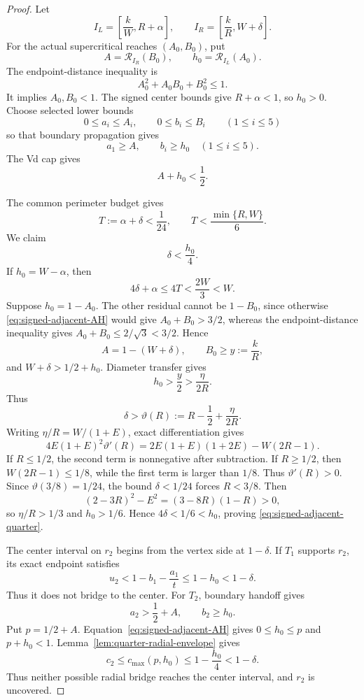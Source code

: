 \begin{proof}
Let
\[
 I_L=\left[\frac{k}{W},R+\alpha\right],
 \qquad
 I_R=\left[\frac{k}{R},W+\delta\right].
\]
For the actual supercritical reaches $(A_0,B_0)$, put
\[
 A=\mathcal R_{I_R}(B_0),
 \qquad
 h_0=\mathcal R_{I_L}(A_0).
\]
The endpoint-distance inequality is
\[
 A_0^2+A_0B_0+B_0^2\le1.
\]
It implies $A_0,B_0<1$.  The signed center bounds give
$R+\alpha<1$, so $h_0>0$. Choose selected lower bounds
\[
 0\le a_i\le A_i,\qquad 0\le b_i\le B_i\qquad(1\le i\le5)
\]
so that boundary propagation gives
\[
 a_1\ge A,
 \qquad
 b_i\ge h_0\quad(1\le i\le5).
\]
The Vd cap gives
\begin{equation}
 A+h_0<\frac12.
 \label{eq:signed-adjacent-AH}
\end{equation}

The common perimeter budget gives
\[
 T:=\alpha+\delta<\frac1{24},
 \qquad
 T<\frac{\min\{R,W\}}6.
\]
We claim
\begin{equation}
 \delta<\frac {h_0}4.
 \label{eq:signed-adjacent-quarter}
\end{equation}
If $h_0=W-\alpha$, then
\[
 4\delta+\alpha\le4T<\frac{2W}{3}<W.
\]
Suppose $h_0=1-A_0$.  The other residual cannot be $1-B_0$, since otherwise
\eqref{eq:signed-adjacent-AH} would give $A_0+B_0>3/2$, whereas
the endpoint-distance inequality gives
$A_0+B_0\le2/\sqrt3<3/2$.  Hence
\[
 A=1-(W+\delta),
 \qquad
 B_0\ge y:=\frac{k}{R},
\]
and $W+\delta>1/2+h_0$.  Diameter transfer gives
\[
 h_0>\frac y2>\frac{\eta}{2R}.
\]
Thus
\[
 \delta>\vartheta(R):=R-\frac12+\frac{\eta}{2R}.
\]
Writing $\eta/R=W/(1+E)$, exact differentiation gives
\[
 4E(1+E)^2\vartheta'(R)
 =2E(1+E)(1+2E)-W(2R-1).
\]
If $R\le1/2$, the second term is nonnegative after subtraction.  If
$R\ge1/2$, then $W(2R-1)\le1/8$, while the first term is larger
than $1/8$.  Thus $\vartheta'(R)>0$.  Since $\vartheta(3/8)=1/24$, the bound
$\delta<1/24$ forces $R<3/8$.  Then
\[
 (2-3R)^2-E^2=(3-8R)(1-R)>0,
\]
so $\eta/R>1/3$ and $h_0>1/6$.  Hence $4\delta<1/6<h_0$, proving
\eqref{eq:signed-adjacent-quarter}.

The center interval on $r_2$ begins from the vertex side at $1-\delta$.  If
$T_1$ supports $r_2$, its exact endpoint satisfies
\[
 u_2<1-b_1-\frac{a_1}{t}\le1-h_0<1-\delta.
\]
Thus it does not bridge to the center.  For $T_2$, boundary handoff gives
\[
 a_2>\frac12+A,
 \qquad b_2\ge h_0.
\]
Put $p=1/2+A$.  Equation~\eqref{eq:signed-adjacent-AH} gives
$0\le h_0\le p$ and $p+h_0<1$.  Lemma~\ref{lem:quarter-radial-envelope} gives
\[
 c_2\le c_{\max}(p,h_0)
 \le1-\frac {h_0}4
 <1-\delta.
\]
Thus neither possible radial bridge reaches the center interval, and $r_2$ is
uncovered.
\end{proof}

